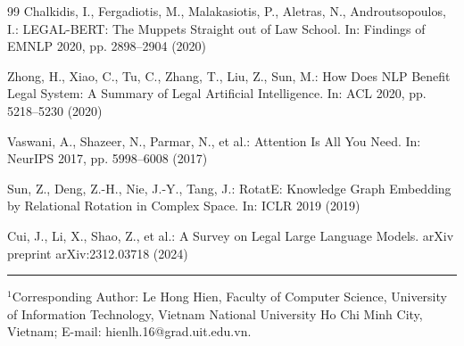 \documentclass[11pt,a4paper]{article}
\begin{document}
\begin{thebibliography}{99}
Chalkidis, I., Fergadiotis, M., Malakasiotis, P., Aletras, N., Androutsopoulos, I.: LEGAL-BERT: The Muppets Straight out of Law School. In: Findings of EMNLP 2020, pp. 2898--2904 (2020)

Zhong, H., Xiao, C., Tu, C., Zhang, T., Liu, Z., Sun, M.: How Does NLP Benefit Legal System: A Summary of Legal Artificial Intelligence. In: ACL 2020, pp. 5218--5230 (2020)

Vaswani, A., Shazeer, N., Parmar, N., et al.: Attention Is All You Need. In: NeurIPS 2017, pp. 5998--6008 (2017)

Sun, Z., Deng, Z.-H., Nie, J.-Y., Tang, J.: RotatE: Knowledge Graph Embedding by Relational Rotation in Complex Space. In: ICLR 2019 (2019)

Cui, J., Li, X., Shao, Z., et al.: A Survey on Legal Large Language Models. arXiv preprint arXiv:2312.03718 (2024)

\end{thebibliography}

\vspace{0.5em}
\hrule
\vspace{0.3em}
\footnotesize
$^1$Corresponding Author: Le Hong Hien, Faculty of Computer Science, University of Information Technology, Vietnam National University Ho Chi Minh City, Vietnam; E-mail: hienlh.16@grad.uit.edu.vn.
\end{document}
